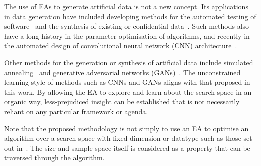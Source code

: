 
The use of EAs to generate artificial data is not a new concept. Its
applications in data generation have included developing methods for the
automated testing of software~\cite{Koleejan2015,Michael2001,Sharifipour2018}
and the synthesis of existing or confidential data~\cite{Chen2016}. Such methods
also have a long history in the parameter optimisation of algorithms, and
recently in the automated design of convolutional neural network (CNN)
architecture~\cite{Suganuma2017,Sun2018}.

Other methods for the generation or synthesis of artificial data include
simulated annealing~\cite{Matejka2017} and generative adversarial networks
(GANs)~\cite{Goodfellow2014}. The unconstrained learning style of methods such
as CNNs and GANs aligns with that proposed in this work. By allowing the EA to
explore and learn about the search space in an organic way, less-prejudiced
insight can be established that is not necessarily reliant on any particular
framework or agenda.

Note that the proposed methodology is not simply to use an EA to optimise an
algorithm over a search space with fixed dimension or datatype such as those set
out in~\cite{Chen2016}. The size and sample space itself is considered as a
property that can be traversed through the algorithm.
